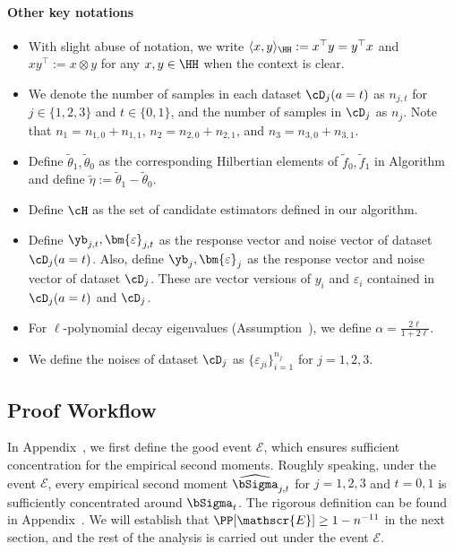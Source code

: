 \documentclass[12pt,a4paper,pdftex,onepage]{article}
\newcommand{\Sighat}{\widehat{{\bSigma}}}
\newcommand{\event}{\mathscr{E}}
\begin{document}
\paragraph{Other key notations}
\begin{itemize}
\item With slight abuse of notation, we write \(\langle x,y\rangle_{\HH} := x^\top y = y^\top x\) and $xy^\top := x \otimes y$ for any \(x, y \in \HH\) when the context is clear. 

\item We denote the number of samples in each dataset $\cD_j(a=t)$ as \(n_{j,t}\) for \(j \in \{1,2,3\}\) and \(t \in \{0,1\}\), and the number of samples in \(\cD_j\) as \(n_j\).
Note that $n_1 = n_{1,0} + n_{1,1}$, $n_2 = n_{2,0} + n_{2,1}$, and $n_3 = n_{3,0} + n_{3,1}$.

\item Define $\tilde{\theta}_1, \tilde{\theta}_0$ as the corresponding Hilbertian elements of $\tilde{f}_0, \tilde{f}_1$ in Algorithm~ and define $\tilde{\eta} := \tilde{\theta}_1 - \tilde{\theta}_0$. 

\item Define $\cH$ as the set of candidate estimators defined in our algorithm.

\item Define \(\yb_{j,t}, \bm{\varepsilon}_{j,t}\) as the response vector and noise vector of dataset \(\cD_j(a=t)\).
Also, define \(\yb_{j}, \bm{\varepsilon}_{j}\) as the response vector and noise vector of dataset \(\cD_{j}\).
These are vector versions of \(y_i\) and \(\varepsilon_i\) contained in \(\cD_j(a=t)\) and \(\cD_j\).


\item For \(\ell\)-polynomial decay eigenvalues (Assumption~), we define \(\alpha = \frac{2\ell}{1+2\ell}\).

\item We define the noises of dataset $\cD_j$ as $\{\varepsilon_{ji}\}_{i=1}^{n_j}$ for \(j=1,2,3\).
\end{itemize}

\subsection{Proof Workflow}
In Appendix~, we first define the good event $\event$, which ensures sufficient concentration for the empirical second moments.  
Roughly speaking, under the event $\event$, every empirical second moment  
$\Sighat_{j,t}$ for $j = 1, 2, 3$ and $t = 0, 1$ is sufficiently concentrated around $\bSigma_{t}$.  
The rigorous definition can be found in Appendix~.  
We will establish that $\PP[\event] \geq 1 - n^{-11}$ in the next section, and the rest of the analysis is carried out under the event $\event$.  
\end{document}
